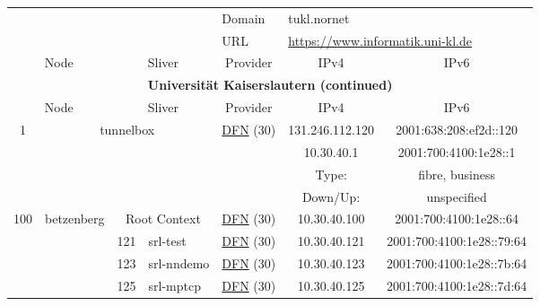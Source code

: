 \begin{small}
\begin{center}
\begin{longtable}{|c|c|c|c|c|c|c|c|}
 \multicolumn{4}{|c|}{} & \multicolumn{1}{|l|}{Domain} & \multicolumn{3}{|l|}{\index{tukl.nornet}tukl.nornet} \\* \cline{5-5}\cline{6-6}\cline{7-7}\cline{8-8}
 \multicolumn{4}{|c|}{} & \multicolumn{1}{|l|}{URL} & \multicolumn{3}{|l|}{\url{https://www.informatik.uni-kl.de}} \\ \hline
 \multicolumn{2}{|p{8em}|}{Node} & \multicolumn{2}{|p{8em}|}{Sliver} & \multicolumn{2}{|p{8em}|}{Provider} & IPv4 & IPv6 \\ \hline
\endfirsthead
\hline
 \multicolumn{8}{|c|}{\textbf{Universität Kaiserslautern (continued)}} \\ \hline
 \multicolumn{2}{|p{8em}|}{Node} & \multicolumn{2}{|p{8em}|}{Sliver} & \multicolumn{2}{|p{8em}|}{Provider} & IPv4 & IPv6 \\ \hline
\endhead
 \multirow{4}{*}{\tiny{1}} & \multicolumn{3}{|c|}{\multirow{4}{*}{\tiny{tunnelbox}}} & \multicolumn{2}{|c|}{\multirow{4}{*}{\tiny{\href{https://www.dfn.de}{DFN} (30)}}} & \tiny{131.246.112.120} & \tiny{2001:638:208:ef2d::120} \\* \cline{7-7}\cline{8-8}
  & \multicolumn{3}{|c|}{} & \multicolumn{2}{|c|}{} & \tiny{10.30.40.1} & \tiny{2001:700:4100:1e28::1} \\* \cline{7-7}\cline{8-8}
  & \multicolumn{3}{|c|}{} & \multicolumn{2}{|c|}{} & Type: & fibre, business \\* \cline{7-7}\cline{8-8}
  & \multicolumn{3}{|c|}{} & \multicolumn{2}{|c|}{} & Down/Up:  & unspecified \\ \hline
 \multirow{16}{*}{\tiny{100}} & \multicolumn{1}{|l|}{\multirow{16}{*}{\tiny{betzenberg}}} & \multicolumn{2}{|c|}{\tiny{Root Context}} & \multicolumn{2}{|c|}{\tiny{\href{https://www.dfn.de}{DFN} (30)}} & \tiny{10.30.40.100} & \tiny{2001:700:4100:1e28::64} \\* \cline{3-3}\cline{4-4}\cline{5-5}\cline{6-6}\cline{7-7}\cline{8-8}
  &  & \tiny{121} & \multicolumn{1}{|l|}{\tiny{srl-test}} & \multicolumn{2}{|c|}{\tiny{\href{https://www.dfn.de}{DFN} (30)}} & \tiny{10.30.40.121} & \tiny{2001:700:4100:1e28::79:64} \\* \cline{3-3}\cline{4-4}\cline{5-5}\cline{6-6}\cline{7-7}\cline{8-8}
  &  & \tiny{123} & \multicolumn{1}{|l|}{\tiny{srl-nndemo}} & \multicolumn{2}{|c|}{\tiny{\href{https://www.dfn.de}{DFN} (30)}} & \tiny{10.30.40.123} & \tiny{2001:700:4100:1e28::7b:64} \\* \cline{3-3}\cline{4-4}\cline{5-5}\cline{6-6}\cline{7-7}\cline{8-8}
  &  & \tiny{125} & \multicolumn{1}{|l|}{\tiny{srl-mptcp}} & \multicolumn{2}{|c|}{\tiny{\href{https://www.dfn.de}{DFN} (30)}} & \tiny{10.30.40.125} & \tiny{2001:700:4100:1e28::7d:64} \\* \cline{3-3}\cline{4-4}\cline{5-5}\cline{6-6}\cline{7-7}\cline{8-8}

\end{longtable}
\end{center}
\end{small}
